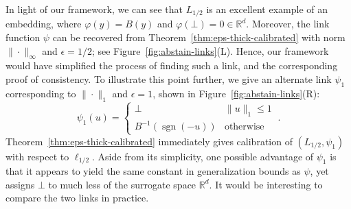 \documentclass[12pt]{article}
\newcommand{\reals}{\mathbb{R}}
\newcommand{\ellabs}[1]{\ell_{#1}}
\DeclareMathOperator*{\sgn}{sgn}
\begin{document}
In light of our framework, we can see that $L_{1/2}$ is an excellent example of an embedding, where $\varphi(y) = B(y)$ and $\varphi(\bot) = 0 \in \reals^d$.
Moreover, the link function $\psi$ can be recovered from Theorem~\ref{thm:eps-thick-calibrated} with norm $\|\cdot\|_\infty$ and $\epsilon=1/2$; see Figure~\ref{fig:abstain-links}(L).
Hence, our framework would have simplified the process of finding such a link, and the corresponding proof of consistency.
To illustrate this point further, we give an alternate link $\psi_1$ corresponding to $\|\cdot\|_1$ and $\epsilon=1$, shown in Figure~\ref{fig:abstain-links}(R):
\begin{equation}\label{eq:abstain-link-1}
  \psi_1(u) = \begin{cases}
	\bot & \|u\|_1 \leq 1\\
	B^{-1}(\sgn(-u)) &\text{otherwise}
  \end{cases}~.
\end{equation}
Theorem~\ref{thm:eps-thick-calibrated} immediately gives calibration of $(L_{1/2},\psi_1)$ with respect to $\ellabs{1/2}$.
Aside from its simplicity, one possible advantage of $\psi_1$ is that it appears to yield the same constant in generalization bounds as $\psi$, yet assigns $\bot$ to much less of the surrogate space $\reals^d$.
It would be interesting to compare the two links in practice.
\end{document}

